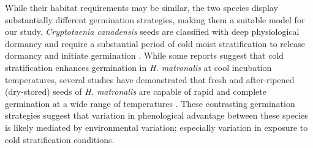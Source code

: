 \documentclass{article}[11pt]
\begin{document}
While their habitat requirements may be similar, the two species display substantially different germination strategies, making them a suitable model for our study. \textit{Cryptotaenia canadensis} seeds are classified with deep physiological dormancy and require a substantial period of cold moist stratification to release dormancy and initiate germination \citep{Baskin:1988um}. While some reports suggest that cold stratification enhances germination in \textit{H. matronalis} at cool incubation temperatures, several studies have demonstrated that fresh and after-ripened (dry-stored) seeds of \textit{H. matronalis} are capable of rapid and complete germination at a wide range of temperatures \citep{Susko:2008ut}. These contrasting germination strategies suggest that variation in phenological advantage between these species is likely mediated by environmental variation; especially variation in exposure to cold stratification conditions.


\end{document}
